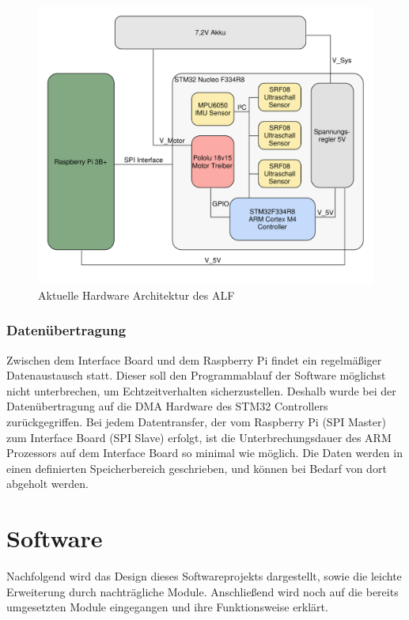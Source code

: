 \begin{figure}[hbtp]
\centering
\includegraphics[scale=0.5]{images/chapter5/HW-Architecture.pdf}
\caption{Aktuelle Hardware Architektur des ALF \label{fig:IfBoardHWUebersicht}}
\end{figure}

\subsection{Datenübertragung}

Zwischen dem Interface Board und dem Raspberry Pi findet ein regelmäßiger Datenaustausch statt. Dieser soll den Programmablauf der Software möglichst nicht unterbrechen, um Echtzeitverhalten sicherzustellen. Deshalb wurde bei der Datenübertragung auf die DMA Hardware des STM32 Controllers zurückgegriffen. Bei jedem Datentransfer, der vom Raspberry Pi (SPI Master) zum Interface Board (SPI Slave) erfolgt, ist die Unterbrechungsdauer des ARM Prozessors auf dem Interface Board so minimal wie möglich. Die Daten werden in einen definierten Speicherbereich geschrieben, und können bei Bedarf von dort abgeholt werden.













\chapter{Software}
Nachfolgend wird das Design dieses Softwareprojekts dargestellt, sowie die leichte Erweiterung durch nachträgliche Module. Anschließend wird noch auf die bereits umgesetzten Module eingegangen und ihre Funktionsweise erklärt. 

